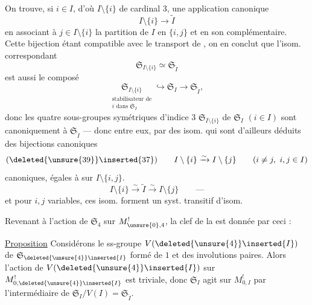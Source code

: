 On trouve, si $i\in I$, d'où $I\setminus\{i\}$ de
cardinal $3$,  une application canonique
\[
\tag{34}
I\setminus\{i\}\longrightarrow\widetilde I
\]
en associant à $j\in I\setminus\{i\}$ la partition
de $I$ en $\{i,j\}$ et en son complémentaire.
Cette bijection étant compatible avec le
transport de , on en conclut
que l'isom. correspondant
\[
\tag{35}
\mathfrak{S}_{I\setminus\{i\}}\simeq\mathfrak{S}_{\widetilde I}
\]
 est  aussi le composé
\[
\tag{36}
\underset{\substack{\text{stabilisateur de}\\ i\text{ dans }\mathfrak{S}_I}}
{\mathfrak{S}_{I\setminus\{i\}}}
\hookrightarrow\mathfrak{S}_I\longrightarrow\mathfrak{S}_{\widetilde I},
\]
donc les quatre sous-groupes symétriques
d'indice $3$ $\mathfrak{S}_{I\setminus\{i\}}$ de $\mathfrak{S}_I$ $(i\in I)$
sont canoniquement  à $\mathfrak{S}_{\widetilde I}$
--- donc entre eux,  par des isom. qui
 sont  d'ailleurs  déduits des bijections
canoniques 
\[
  (\deleted{\unsure{39}}\inserted{37})\qquad
  I\setminus\{i\}\xrightarrow{\sim}I\setminus\{j\}
  \qquad(i\ne j,\ i,j\in I)
\]
canoniques, égales à 
 sur $I\setminus\{i,j\}$.
\[
  I\setminus\{i\}\xrightarrow{\sim}\widetilde I
  \xrightarrow{\sim}I\setminus\{j\}
  \qquad\text{---}
\]
et pour $i,j$ variables, ces isom. forment un
syst. transitif d'isom.

Revenant à l'action de $\mathfrak{S}_4$ sur
$M_{\unsure{0},4}^{!}$, la clef de la 
est donnée par ceci :

\uline{Proposition} Considérons le ss-groupe
$V(\deleted{\unsure{4}}\inserted{I})$ de $\mathfrak{S}_{\deleted{\unsure{4}}\inserted{I}}$ formé de $1$ et des involutions
paires. Alors l'action de $V(\deleted{\unsure{4}}\inserted{I})$ sur $M_{0,\deleted{\unsure{4}}\inserted{I}}^{!}$
est triviale,  donc  $\mathfrak{S}_I$ agit
sur $M_{0,I}^{!}$ par l'intermédiaire de
$\mathfrak{S}_I/V(I)=\mathfrak{S}_{\widetilde I}$.

